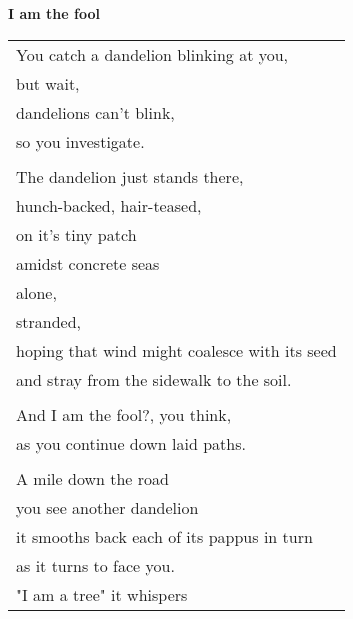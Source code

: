 \documentclass{article}
\begin{document}
\begin{center}
\textbf{I am the fool}\\
\begin{tabular}{l}
\\
You catch a dandelion blinking at you, \\
but wait, \\
dandelions can't blink, \\ %
so you investigate. \\
\\
The dandelion just stands there, \\
hunch-backed, hair-teased, \\
on it's tiny patch \\
amidst concrete seas \\
\hspace*{2em}alone, \\
\hspace*{4em}stranded, \\
hoping that wind might coalesce with its seed \\
and stray from the sidewalk to the soil. \\
\\
And I am the fool?, you think, \\
as you continue down laid paths. \\
\\
A mile down the road \\
you see another dandelion \\
it smooths back each of its pappus in turn \\
as it turns to face you. \\
"I am a tree" it whispers \\

%
%
%
\end{tabular}
\end{center}
\end{document}
